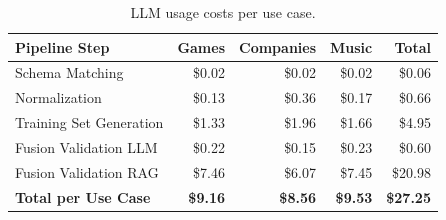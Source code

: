 
\begin{table}[t]
\caption{LLM usage costs per use case.}
\label{tab:pipeline_costs}
\centering
\footnotesize
\begin{tabular}{@{}l rrr r@{}}
\toprule
\textbf{Pipeline Step} & \textbf{Games} & \textbf{Companies} & \textbf{Music} & \textbf{Total} \\
\midrule
Schema Matching & \$0.02 & \$0.02 & \$0.02 & \$0.06 \\
Normalization & \$0.13 & \$0.36 & \$0.17 & \$0.66 \\
Training Set Generation & \$1.33 & \$1.96 & \$1.66 & \$4.95 \\
Fusion Validation LLM & \$0.22 & \$0.15 & \$0.23 & \$0.60 \\
Fusion Validation RAG & \$7.46 & \$6.07 & \$7.45 & \$20.98 \\

\midrule
\textbf{Total per Use Case} & \textbf{\$9.16} & \textbf{\$8.56} & \textbf{\$9.53} & \textbf{\$27.25} \\
\bottomrule
\end{tabular}
\end{table}
